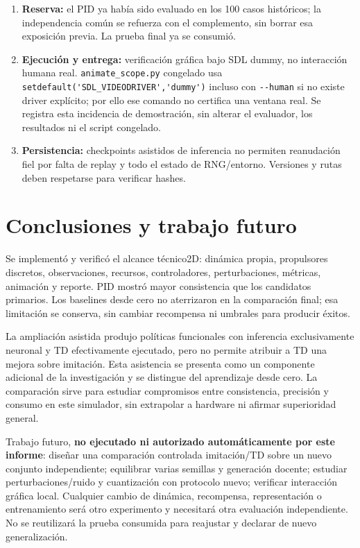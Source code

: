 \documentclass[12pt,a4paper]{article}
\begin{document}
\begin{enumerate}
\item \textbf{Reserva:} el PID ya había sido evaluado en los 100 casos históricos; la independencia común se refuerza con el complemento,\allowbreak{} sin borrar esa exposición previa. La prueba final ya se consumió.
\item \textbf{Ejecución y entrega:} verificación gráfica bajo SDL dummy,\allowbreak{} no interacción humana real. \nolinkurl{animate_scope.py} congelado usa \nolinkurl{setdefault('SDL_VIDEODRIVER','dummy')} incluso con \nolinkurl{--human} si no existe driver explícito; por ello ese comando no certifica una ventana real. Se registra esta incidencia de demostración,\allowbreak{} sin alterar el evaluador,\allowbreak{} los resultados ni el script congelado.
\item \textbf{Persistencia:} checkpoints asistidos de inferencia no permiten reanudación fiel por falta de replay y todo el estado de RNG/\allowbreak{}entorno. Versiones y rutas deben respetarse para verificar hashes.\end{enumerate}


\section{Conclusiones y trabajo futuro}
Se implementó y verificó el alcance técnico2D: dinámica propia,\allowbreak{} propulsores discretos,\allowbreak{} observaciones,\allowbreak{} recursos,\allowbreak{} controladores,\allowbreak{} perturbaciones,\allowbreak{} métricas,\allowbreak{} animación y reporte. PID mostró mayor consistencia que los candidatos primarios. Los baselines desde cero no aterrizaron en la comparación final; esa limitación se conserva,\allowbreak{} sin cambiar recompensa ni umbrales para producir éxitos.


La ampliación asistida produjo políticas funcionales con inferencia exclusivamente neuronal y TD efectivamente ejecutado,\allowbreak{} pero no permite atribuir a TD una mejora sobre imitación. Esta asistencia se presenta como un componente adicional de la investigación y se distingue del aprendizaje desde cero. La comparación sirve para estudiar compromisos entre consistencia,\allowbreak{} precisión y consumo en este simulador,\allowbreak{} sin extrapolar a hardware ni afirmar superioridad general.


Trabajo futuro,\allowbreak{} \textbf{no ejecutado ni autorizado automáticamente por este informe}: diseñar una comparación controlada imitación/\allowbreak{}TD sobre un nuevo conjunto independiente; equilibrar varias semillas y generación docente; estudiar perturbaciones/\allowbreak{}ruido y cuantización con protocolo nuevo; verificar interacción gráfica local. Cualquier cambio de dinámica,\allowbreak{} recompensa,\allowbreak{} representación o entrenamiento será otro experimento y necesitará otra evaluación independiente. No se reutilizará la prueba consumida para reajustar y declarar de nuevo generalización.
\end{document}
